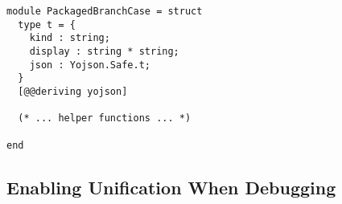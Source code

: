 \begin{lstlisting}[caption={
  The \texttt{PackagedBranchCase} type, inside the \texttt{Debugger} module
  \label{lst:packagedbranchcase}}, style=code, numbers=none]
module PackagedBranchCase = struct
  type t = {
    kind : string;
    display : string * string;
    json : Yojson.Safe.t;
  }
  [@@deriving yojson]

  (* ... helper functions ... *)

end
\end{lstlisting}

\subsection{Enabling Unification When Debugging}
